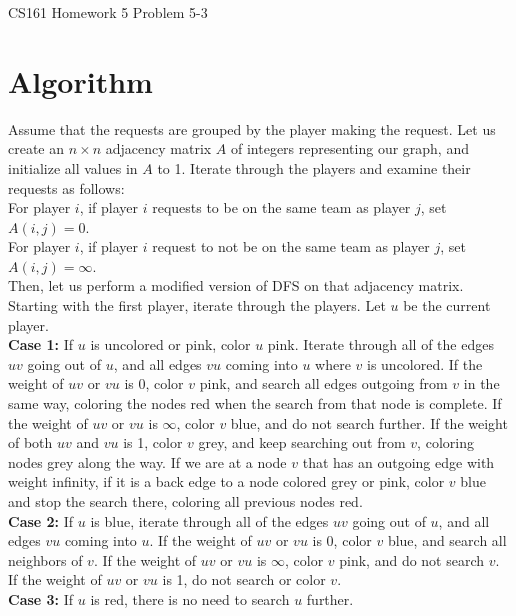 \documentclass[12pt]{article}
\begin{document}
\begin{center}
{\Large CS161 Homework 5 Problem 5-3}

\end{center}

\section*{Algorithm}

Assume that the requests are grouped by the player making the request. Let us create an $n \times n$ adjacency matrix $A$ of integers representing our graph, and initialize all values in $A$ to 1. Iterate through the players and examine their requests as follows:\\ 
For player $i$, if player $i$ requests to be on the same team as player $j$, set $A(i, j) = 0$.\\
For player $i$, if player $i$ request to not be on the same team as player $j$, set $A(i, j) = \infty$.\\
Then, let us perform a modified version of DFS on that adjacency matrix. Starting with the first player, iterate through the players. Let $u$ be the current player.\\
\textbf{Case 1:} If $u$ is uncolored or pink, color $u$ pink. Iterate through all of the edges $uv$ going out of $u$, and all edges $vu$ coming into $u$ where $v$ is uncolored. If the weight of $uv$ or $vu$ is 0, color $v$ pink, and search all edges outgoing from $v$ in the same way, coloring the nodes red when the search from that node is complete. If the weight of $uv$ or $vu$ is $\infty$, color $v$ blue, and do not search further. If the weight of both $uv$ and $vu$ is 1, color $v$ grey, and keep searching out from $v$, coloring nodes grey along the way. If we are at a node $v$ that has an outgoing edge with weight infinity, if it is a back edge to a node colored grey or pink, color $v$ blue and stop the search there, coloring all previous nodes red.\\
\textbf{Case 2:} If $u$ is blue, iterate through all of the edges $uv$ going out of $u$, and all edges $vu$ coming into $u$. If the weight of $uv$ or $vu$ is 0, color $v$ blue, and search all neighbors of $v$. If the weight of $uv$ or $vu$ is $\infty$, color $v$ pink, and do not search $v$. If the weight of $uv$ or $vu$ is 1, do not search or color $v$.\\
\textbf{Case 3:} If $u$ is red, there is no need to search $u$ further.\\
\end{document}
